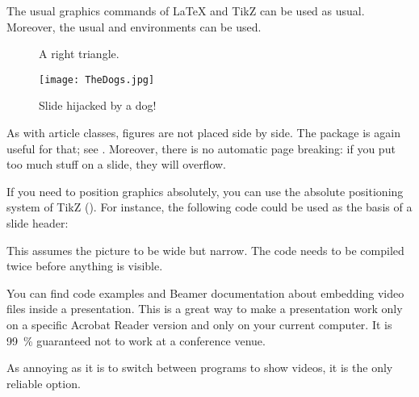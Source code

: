 The usual graphics commands of \LaTeX{} and TikZ can be used as usual.
Moreover, the usual  and  environments can be used.
%
\begin{ExampleCode}
\begin{figure}
\caption{A right triangle.}
\end{figure}

\begin{figure}
    \texttt{[image: TheDogs.jpg]}
\caption{Slide hijacked by a dog!}
\end{figure}
\end{ExampleCode}
%

\begin{gotcha}
As with article classes, figures are not placed side by side.
The  package is again useful for that;
see .
Moreover, there is no automatic page breaking:
if you put too much stuff on a slide, they will overflow.
\end{gotcha}


If you need to position graphics absolutely,
you can use the absolute positioning system of TikZ ().
For instance, the following code could be used as the basis of a slide header:
\begin{ExampleCode}
\end{ExampleCode}
This assumes the picture to be wide but narrow.
The code needs to be compiled twice before anything is visible.


\begin{warning}
You can find code examples and Beamer documentation about embedding video files inside a presentation.
This is a great way to make a presentation work only on a specific Acrobat Reader version
and only on your current computer.
It is 99~\% guaranteed not to work at a conference venue.

As annoying as it is to switch between programs to show videos,
it is the only reliable option.
\end{warning}


